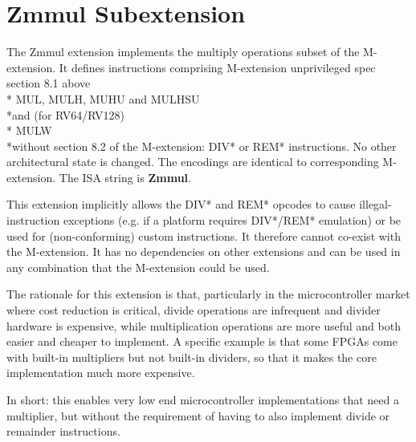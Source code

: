 \section{ Zmmul Subextension}

The Zmmul extension implements the multiply operations subset of the M-extension.
It defines instructions comprising M-extension unprivileged spec section 8.1 above
\\*    MUL, MULH, MUHU and MULHSU 
\\*and (for RV64/RV128) 
\\*    MULW 
\\*without section 8.2 of the M-extension: DIV* or REM* instructions.
No other architectural state is changed.
The encodings are identical to corresponding M-extension.  
The ISA string is \textbf{Zmmul}.

This extension implicitly allows the DIV* and REM* opcodes to cause
illegal-instruction exceptions (e.g. if a platform requires DIV*/REM*
emulation) or be used for (non-conforming) custom instructions. It
therefore cannot co-exist with the M-extension. It has no dependencies
on other extensions and can be used in any combination that the
M-extension could be used.

\begin{commentary}
The rationale for this extension is that, particularly in the
microcontroller market where cost reduction is critical, divide
operations are infrequent and divider hardware is expensive, while
multiplication operations are more useful and both easier and cheaper to
implement. A specific example is that some FPGAs come with built-in
multipliers but not built-in dividers, so that it makes the core
implementation much more expensive.

In short: this enables very low end microcontroller implementations that
need a multiplier, but without the requirement of having to also
implement divide or remainder instructions.
\end{commentary}
